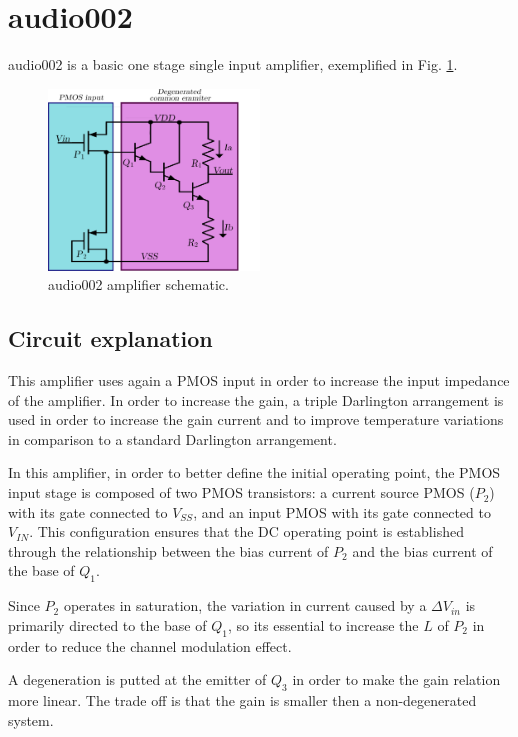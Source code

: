 \documentclass[12pt]{article}
\begin{document}
\newpage


\section{audio002}

audio002 is a basic one stage single input amplifier, exemplified in Fig. \ref{audio002}.
\begin{figure}[H]
        \centering
        \includegraphics[width=0.5\textwidth]{audio002.pdf}
        \caption{audio002 amplifier schematic.}
        \label{audio002}
\end{figure}

\subsection{Circuit explanation}
This amplifier uses again a PMOS input in order to increase the input impedance of the amplifier. In order to increase the gain, a triple Darlington arrangement is used in order to increase the gain current and to improve temperature variations in comparison to a standard Darlington arrangement.

In this amplifier, in order to better define the initial operating point, the PMOS input stage is composed of two PMOS transistors: a current source PMOS ($P_2$) with its gate connected to $V_{SS}$, and an input PMOS with its gate connected to $V_{IN}$. This configuration ensures that the DC operating point is established through the relationship between the bias current of $P_2$ and the bias current of the base of $Q_1$.  

Since $P_2$ operates in saturation, the variation in current caused by a $\Delta V_{in}$ is primarily directed to the base of $Q_1$, so its essential to increase the $L$ of $P_{2}$ in order to reduce the channel modulation effect.

 A degeneration is putted  at the emitter of $Q_3$ in order to make the gain relation more linear. The trade off is that the gain is smaller then a non-degenerated system.
\end{document}
